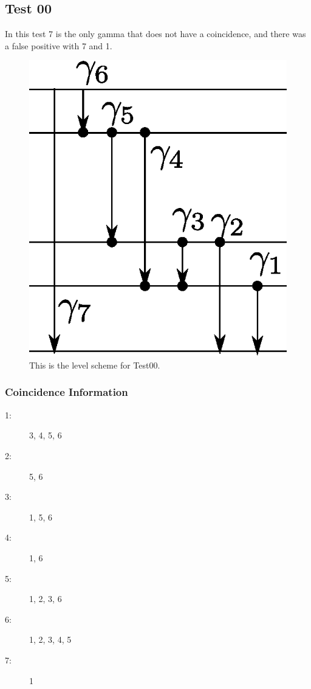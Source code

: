 \documentclass[12pt]{article}
\begin{document}
\subsection {Test 00}
In this test 7 is the only gamma that does not have a coincidence, and there 
was a false positive with 7 and 1.
\begin{figure} [t]
  \begin{center}
    \includegraphics{../pictures/test00.eps}
    \caption{This is the level scheme for Test00.}
    \label{fig:test00}
  \end{center}
\end{figure}
\subsubsection{Coincidence Information}
\begin{multicols}{2}
\begin{description}
\item[1: ] 3, 4, 5, 6
\item[2: ] 5, 6 
\item[3: ] 1, 5, 6 
\item[4: ] 1, 6 
\item[5: ] 1, 2, 3, 6
\item[6: ] 1, 2, 3, 4, 5
\item[7: ] 1
\end{description}
\end{multicols}
\end{document}
